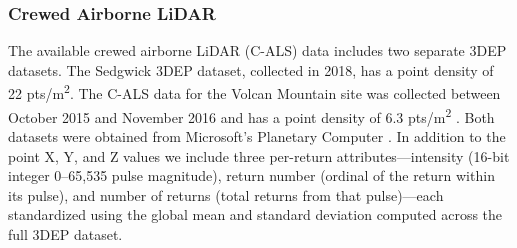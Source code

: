 \documentclass[remotesensing,article,submit,pdftex,moreauthors]{Definitions/mdpi}
\begin{document}
\subsubsection{Crewed Airborne LiDAR}
The available crewed airborne LiDAR (C-ALS) data includes two separate 3DEP datasets. The  Sedgwick  3DEP dataset, collected in 2018, has a point density of 22 pts/m\textsuperscript{2}. The C-ALS data for the Volcan Mountain site was collected between October 2015 and November 2016 and has a point density of 6.3 pts/m\textsuperscript{2} \citep{usgs_usgs_2016}. Both datasets were obtained from Microsoft's Planetary Computer \citep{us_geological_survey_3d_elevation_program_usgs_2023,planetary_computer}.
In addition to the point X, Y, and Z values we include three per-return attributes—intensity (16-bit integer 0–65,535 pulse magnitude), return number (ordinal of the return within its pulse), and number of returns (total returns from that pulse)—each standardized using the global mean and standard deviation computed across the full 3DEP dataset.

\begin{table}[H]
\centering
\caption{Timeline of NAIP and UAVSAR acquisitions for both study sites.}
\label{tab:imagery_timeline_v2}
\end{table}
\end{document}
